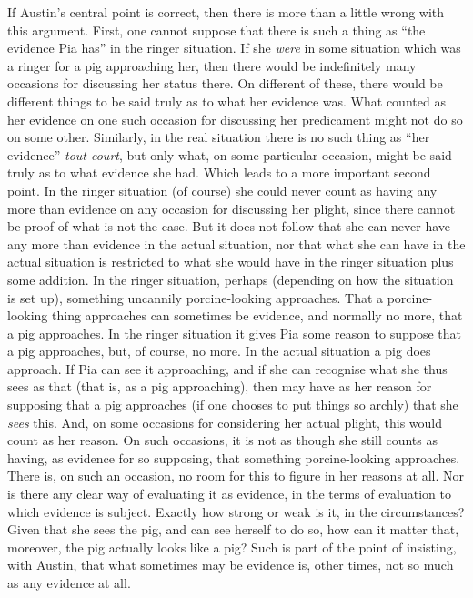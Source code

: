 If Austin's central point is correct, then there is more than a little wrong with this argument. First, one cannot suppose that there is such a thing as ``the evidence Pia has'' in the ringer situation. If she \emph{were} in some situation which was a ringer for a pig approaching her, then there would be indefinitely many occasions for discussing her status there. On different of these, there would be different things to be said truly as to what her evidence was. What counted as her evidence on one such occasion for discussing her predicament might not do so on some other. Similarly, in the real situation there is no such thing as ``her evidence'' \emph{tout court}, but only what, on some particular occasion, might be said truly as to what evidence she had. Which leads to a more important second point. In the ringer situation (of course) she could never count as having any more than evidence on any occasion for discussing her plight, since there cannot be proof of what is not the case. But it does not follow that she can never have any more than evidence in the actual situation, nor that what she can have in the actual situation is restricted to what she would have in the ringer situation plus some addition. In the ringer situation, perhaps (depending on how the situation is set up), something uncannily porcine-looking approaches. That a porcine-looking thing approaches can sometimes be evidence, and normally no more, that a pig approaches. In the ringer situation it gives Pia some reason to suppose that a pig approaches, but, of course, no more. In the actual situation a pig does approach. If Pia can see it approaching, and if she can recognise what she thus sees as that (that is, as a pig approaching), then may have as her reason for supposing that a pig approaches (if one chooses to put things so archly) that she \emph{sees} this. And, on some occasions for considering her actual plight, this would count as her reason. On such occasions, it is not as though she still counts as having, as evidence for so supposing, that something porcine-looking approaches. There is, on such an occasion, no room for this to figure in her reasons at all. Nor is there any clear way of evaluating it as evidence, in the terms of evaluation to which evidence is subject. Exactly how strong or weak is it, in the circumstances? Given that she sees the pig, and can see herself to do so, how can it matter that, moreover, the pig actually looks like a pig? Such is part of the point of insisting, with Austin, that what sometimes may be evidence is, other times, not so much as any evidence at all.

